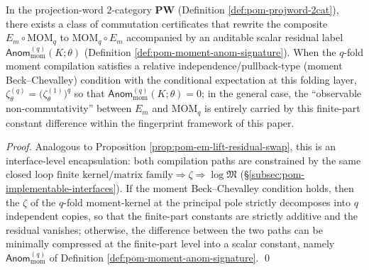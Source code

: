 \begin{proposition}\label{prop:pom-em-mom-residual-swap}
In the projection-word $2$-category \(\mathbf{PW}\) (Definition \ref{def:pom-projword-2cat}), there exists a class of commutation certificates that rewrite the composite
\(
E_m\circ \mathrm{MOM}_q
\)
to
\(
\mathrm{MOM}_q\circ E_m
\)
accompanied by an auditable scalar residual label \(\mathsf{Anom}^{(q)}_{\mathrm{mom}}(K;\theta)\) (Definition \ref{def:pom-moment-anom-signature}).
When the \(q\)-fold moment compilation satisfies a relative independence/pullback-type (moment Beck--Chevalley) condition with the conditional expectation at this folding layer,
\(\zeta^{(q)}_\theta=\bigl(\zeta^{(1)}_\theta\bigr)^q\)
so that \(\mathsf{Anom}^{(q)}_{\mathrm{mom}}(K;\theta)=0\);
in the general case, the ``observable non-commutativity'' between \(E_m\) and \(\mathrm{MOM}_q\) is entirely carried by this finite-part constant difference within the fingerprint framework of this paper.
\end{proposition}

\begin{proof}
Analogous to Proposition \ref{prop:pom-em-lift-residual-swap}, this is an interface-level encapsulation:
both compilation paths are constrained by the same closed loop
\(
\text{finite kernel/matrix family}\Rightarrow \zeta\Rightarrow \log\mathfrak{M}
\)
(\S\ref{subsec:pom-implementable-interfaces}).
If the moment Beck--Chevalley condition holds, then the \(\zeta\) of the \(q\)-fold moment-kernel at the principal pole strictly decomposes into \(q\) independent copies, so that the finite-part constants are strictly additive and the residual vanishes;
otherwise, the difference between the two paths can be minimally compressed at the finite-part level into a scalar constant, namely \(\mathsf{Anom}^{(q)}_{\mathrm{mom}}\) of Definition \ref{def:pom-moment-anom-signature}. \qed
\end{proof}

